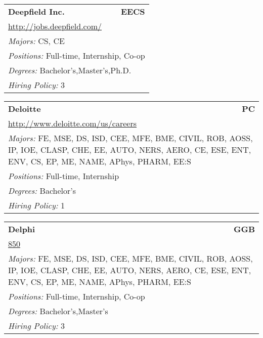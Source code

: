 \documentclass[twoside]{article}
\begin{document}
\begin{center}
\begin{multicols}{3}
\begin{FlushLeft}
\begin{minipage}{\columnwidth}\begin{tabularx}{.95\columnwidth}{Xr}
                 {\Large\bf Deepfield Inc.} & {\Large\bf EECS}\\
    \multicolumn{2}{p{.95\columnwidth}}{\url{http://jobs.deepfield.com/}}\\
    \multicolumn{2}{p{.95\columnwidth}}{\emph{Majors:} CS, CE}\\
    \multicolumn{2}{p{.95\columnwidth}}{\emph{Positions:} Full-time, Internship, Co-op}\\
    \multicolumn{2}{p{.95\columnwidth}}{\emph{Degrees:} Bachelor's,Master's,Ph.D.}\\
    \multicolumn{2}{p{.95\columnwidth}}{\emph{Hiring Policy:} 3}\\
    \end{tabularx}
    
\end{minipage}
 
\begin{minipage}{\columnwidth}\begin{tabularx}{.95\columnwidth}{Xr}
                 {\Large\bf Deloitte} & {\Large\bf PC}\\
    \multicolumn{2}{p{.95\columnwidth}}{\url{http://www.deloitte.com/us/careers}}\\
    \multicolumn{2}{p{.95\columnwidth}}{\emph{Majors:} FE, MSE, DS, ISD, CEE, MFE, BME, CIVIL, ROB, AOSS, IP, IOE, CLASP, CHE, EE, AUTO, NERS, AERO, CE, ESE, ENT, ENV, CS, EP, ME, NAME, APhys, PHARM, EE:S}\\
    \multicolumn{2}{p{.95\columnwidth}}{\emph{Positions:} Full-time, Internship}\\
    \multicolumn{2}{p{.95\columnwidth}}{\emph{Degrees:} Bachelor's}\\
    \multicolumn{2}{p{.95\columnwidth}}{\emph{Hiring Policy:} 1}\\
    \end{tabularx}
    
\end{minipage}
 
\begin{minipage}{\columnwidth}\begin{tabularx}{.95\columnwidth}{Xr}
                 {\Large\bf Delphi} & {\Large\bf GGB}\\
    \multicolumn{2}{p{.95\columnwidth}}{\url{850}}\\
    \multicolumn{2}{p{.95\columnwidth}}{\emph{Majors:} FE, MSE, DS, ISD, CEE, MFE, BME, CIVIL, ROB, AOSS, IP, IOE, CLASP, CHE, EE, AUTO, NERS, AERO, CE, ESE, ENT, ENV, CS, EP, ME, NAME, APhys, PHARM, EE:S}\\
    \multicolumn{2}{p{.95\columnwidth}}{\emph{Positions:} Full-time, Internship, Co-op}\\
    \multicolumn{2}{p{.95\columnwidth}}{\emph{Degrees:} Bachelor's,Master's}\\
    \multicolumn{2}{p{.95\columnwidth}}{\emph{Hiring Policy:} 3}\\
    \end{tabularx}
    

\end{minipage}
\end{FlushLeft}
\end{multicols}
\end{center}
\end{document}
